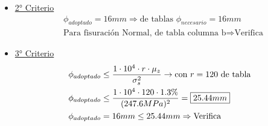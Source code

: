 \begin{enumerate}
\begin{itemize}
\item \underline{2° Criterio}
\begin{align*}
&\phi_{adoptado} = 16mm \Rightarrow \text{de tablas } \phi_{necesario} = 16mm \\
&\text{Para fisuración Normal, de tabla columna b} \Rightarrow \text{Verifica}
\end{align*}

\item \underline{3° Criterio}
\begin{align*}
&\phi_{adoptado} \leq \frac{1 \cdot 10^4 \cdot r \cdot \mu_z}{\sigma_s^2} \rightarrow \text{con $r = 120$ de tabla}\\
&\phi_{adoptado} \leq \frac{1 \cdot 10^4 \cdot 120 \cdot 1.3\%}{(247.6MPa)^2} = \framebox{$25.44mm$} \\
&\phi_{adoptado} = 16mm \leq 25.44mm \Rightarrow \text{Verifica}
\end{align*}

\end{itemize}
\end{enumerate}